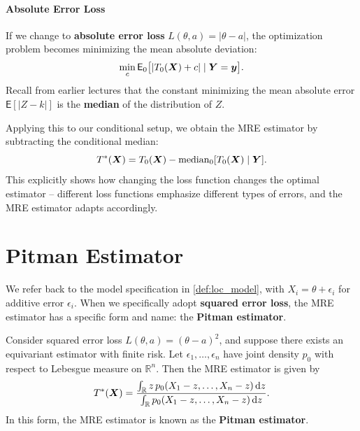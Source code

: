 \paragraph{Absolute Error Loss}
If we change to \textbf{absolute error loss} $L(\theta, a) = |\theta - a|$, the optimization problem becomes minimizing the mean absolute deviation:
\[
\min_c \mathsf{E}_{0} \big[ |T_{0}(\boldsymbol{X}) + c| \mid \boldsymbol{Y}=\boldsymbol{y} \big].
\]
Recall from earlier lectures that the constant minimizing the mean absolute error $\mathsf{E}[|Z - k|]$ is the \textbf{median} of the distribution of $Z$.

Applying this to our conditional setup, we obtain the MRE estimator by subtracting the conditional median:
\begin{equation}
T^*(\boldsymbol{X}) = T_0(\boldsymbol{X}) - \mathrm{median}_0[T_0(\boldsymbol{X}) \mid \boldsymbol{Y}].
\label{eq:mre_abs_error}
\end{equation}
This explicitly shows how changing the loss function changes the optimal estimator -- different loss functions emphasize different types of errors, and the MRE estimator adapts accordingly.

\section{Pitman Estimator}
\label{sec:pitman_estimator}

We refer back to the model specification in \autoref{def:loc_model}, with \(X_i = \theta + \epsilon_i\) for additive error \(\epsilon_i\). When we specifically adopt \textbf{squared error loss}, the MRE estimator has a specific form and name: the \textbf{Pitman estimator}.

\begin{theo}
\label{thm:pitman}
Consider squared error loss \(L(\theta, a) = (\theta - a)^2\), and suppose there exists an equivariant estimator with finite risk. Let \(\epsilon_1, \ldots, \epsilon_n\) have joint density \(p_0\) with respect to Lebesgue measure on \(\mathbb{R}^n\). Then the MRE estimator is given by
\[
T^*(\boldsymbol{X}) = \frac{\int_{\mathbb{R}} z \, p_0(X_1 - z, \dots, X_n - z) \, \mathrm{d}z}{\int_{\mathbb{R}} p_0(X_1 - z, \dots, X_n - z) \, \mathrm{d}z}.
\]
In this form, the MRE estimator is known as the \textbf{Pitman estimator}.
\end{theo}

